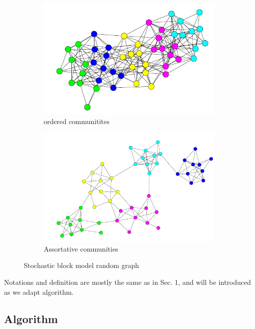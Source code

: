 \documentclass[11pt,a4paper]{article}
\begin{document}
\begin{figure}[ht]
	\centering
	\begin{subfigure}{.49\textwidth}
		\includegraphics[width=\textwidth]{sbm}
		\caption{ordered communitites}
	\end{subfigure}
	\begin{subfigure}{.49\textwidth}
		\includegraphics[width=\textwidth]{assortative}
		\caption{Assortative communities}
	\end{subfigure}
	\caption{Stochastic block model random graph\protect\footnotemark}
	\label{fig:sbm}
\end{figure}


Notations and definition are mostly the same as in Sec. 1, and will be introduced as we adapt \cite{valko} algorithm. 

\subsection{Algorithm}
\end{document}
